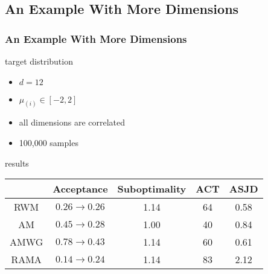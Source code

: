 \subsection{An Example With More Dimensions}

\begin{frame}
\frametitle{An Example With More Dimensions}
\begin{block}{target distribution}
\begin{itemize}
  \item $d=12$
  \item $\mu_{(i)} \in [-2,2]$
  \item all dimensions are correlated
  \item 100,000 samples
\end{itemize}
\end{block}

\begin{block}{results}
\begin{table}
\begin{tabular}{|c|cccc|}
\hline
& Acceptance & Suboptimality & ACT & ASJD\\
\hline
RWM & $0.26\rightarrow 0.26$ & 1.14 & 64 & 0.58\\
AM & $0.45\rightarrow 0.28$ & 1.00 & 40 & 0.84\\
AMWG & $0.78\rightarrow 0.43$ & 1.14 & 60 & 0.61\\
RAMA & $0.14\rightarrow 0.24$ & 1.14 & 83 & 2.12\\
\hline

\end{tabular}
\end{table}
\end{block}
\end{frame}